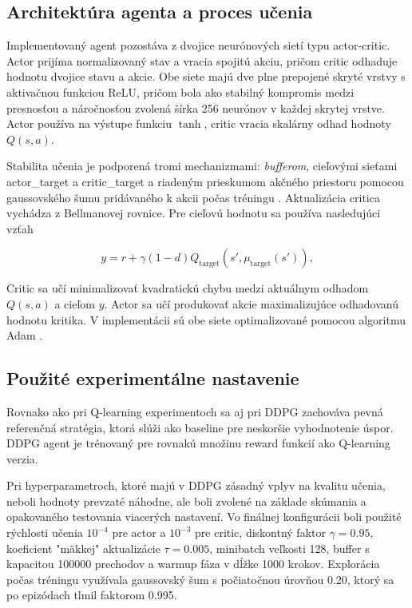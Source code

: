 \documentclass[conference]{IEEEtran}
\begin{document}
\subsection{Architektúra agenta a proces učenia}

Implementovaný agent pozostáva z dvojice neurónových sietí typu actor-critic. Actor prijíma normalizovaný stav a vracia spojitú akciu, pričom critic odhaduje hodnotu dvojice stavu a akcie. Obe siete majú dve plne prepojené skryté vrstvy s aktivačnou funkciou ReLU, pričom bola ako stabilný kompromis medzi presnosťou a náročnosťou zvolená šírka 256 neurónov v každej skrytej vrstve. Actor používa na výstupe funkciu $\tanh$, critic vracia skalárny odhad hodnoty $Q(s,a)$.

Stabilita učenia je podporená tromi mechanizmami: \textit{bufferom}, cieľovými sieťami actor\_target a critic\_target a riadeným prieskumom akčného priestoru pomocou gaussovského šumu pridávaného k akcii počas tréningu \cite{b14}. Aktualizácia critica vychádza z Bellmanovej rovnice. Pre cieľovú hodnotu sa používa nasledujúci vzťah

\begin{equation}
y = r + \gamma (1-d)Q_{\text{target}}\left(s',\mu_{\text{target}}(s')\right),
\end{equation}

Critic sa učí minimalizovať kvadratickú chybu medzi aktuálnym odhadom $Q(s,a)$ a cieľom $y$. Actor sa učí produkovať akcie maximalizujúce odhadovanú hodnotu kritika. V implementácii sú obe siete optimalizované pomocou algoritmu Adam \cite{b16}.

\subsection{Použité experimentálne nastavenie}

Rovnako ako pri Q-learning experimentoch sa aj pri DDPG zachováva pevná referenčná stratégia, ktorá slúži ako baseline pre neskoršie vyhodnotenie úspor. DDPG agent je trénovaný pre rovnakú množinu reward funkcií ako Q-learning verzia.

Pri hyperparametroch, ktoré majú v DDPG zásadný vplyv na kvalitu učenia, neboli hodnoty prevzaté náhodne, ale boli zvolené na základe skúmania a opakovaného testovania viacerých nastavení. Vo finálnej konfigurácii boli použité rýchlosti učenia $10^{-4}$ pre actor a $10^{-3}$ pre critic, diskontný faktor $\gamma = 0.95$, koeficient "mäkkej" aktualizácie $\tau = 0.005$, minibatch veľkosti 128, buffer s kapacitou 100000 prechodov a warmup fáza v dĺžke 1000 krokov. Explorácia počas tréningu využívala gaussovský šum s počiatočnou úrovňou 0.20, ktorý sa po epizódach tlmil faktorom 0.995.
\end{document}
